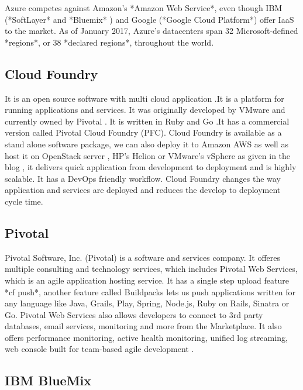     Azure competes against Amazon's *Amazon Web Service*,
    \cite{www-aws-amzn} even though IBM (*SoftLayer*
    \cite{www-softlayer-ibm} and *Bluemix* \cite{www-bluemix-ibm})
    and Google (*Google Cloud Platform*) \cite{www-cloud-google}
    offer IaaS to the market.  As of January 2017, Azure's datacenters
    span 32 Microsoft-defined *regions*, or 38 *declared regions*,
    throughout the world. \cite{www-azure-msft}

\subsection{Cloud Foundry}

    It is an open source software with multi cloud application .It is
    a platform for running applications and services. It was
    originally developed by VMware and currently owned by Pivotal . It
    is written in Ruby and Go .It has a commercial version called
    Pivotal Cloud Foundry (PFC)\cite{www-cloudfoundry-book}. Cloud
    Foundry is available as a stand alone software package, we can
    also deploy it to Amazon AWS as well as host it on OpenStack
    server , HP’s Helion or VMware’s vSphere as given in the blog
    \cite{www-cloudfoundry-blog} , it delivers quick application from
    development to deployment and is highly scalable. It has a DevOps
    friendly workflow.  Cloud Foundry changes the way application and
    services are deployed and reduces the develop to deployment cycle
    time.

\subsection{Pivotal}

    Pivotal Software, Inc. (Pivotal) is a software and services
    company. It offeres multiple consulting and technology services,
    which includes Pivotal Web Services, which is an agile application
    hosting service. It has a single step upload feature *cf push*,
    another feature called Buildpacks lets us push applications
    written for any language like Java, Grails, Play, Spring, Node.js,
    Ruby on Rails, Sinatra or Go. Pivotal Web Services also allows
    developers to connect to 3rd party databases, email services,
    monitoring and more from the Marketplace. It also offers
    performance monitoring, active health monitoring, unified log
    streaming, web console built for team-based agile development
    \cite{pivotal-www}.

\subsection{IBM BlueMix}
